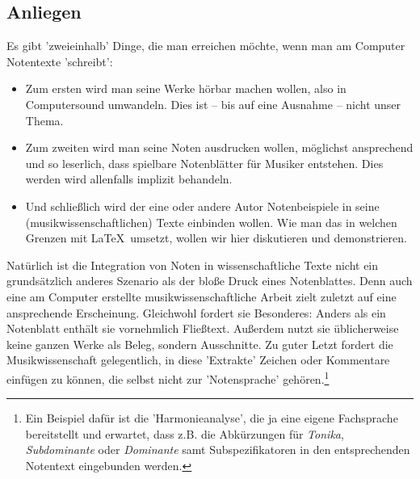 %
%
%



\subsection{Anliegen}

Es gibt 'zweieinhalb' Dinge, die man erreichen möchte, wenn man am Computer
Notentexte 'schreibt':

\begin{itemize}
  \item Zum ersten wird man seine Werke hörbar machen wollen, also in
  Computersound umwandeln. Dies ist -- bis auf eine Ausnahme -- nicht
  unser Thema.
  \item Zum zweiten wird man seine Noten ausdrucken wollen, möglichst
  ansprechend und so leserlich, dass spielbare Notenblätter für Musiker
  entstehen. Dies werden wird allenfalls implizit behandeln.
  \item Und schließlich wird der eine oder andere Autor Notenbeispiele in seine
  (musikwissenschaftlichen) Texte einbinden wollen. Wie man das in welchen
  Grenzen mit \LaTeX\ umsetzt, wollen wir hier diskutieren und demonstrieren.
\end{itemize}

Natürlich ist die Integration von Noten in wissenschaftliche Texte nicht ein
grundsätzlich anderes Szenario als der bloße Druck eines Notenblattes.
Denn auch eine am Computer erstellte musikwissenschaftliche Arbeit zielt zuletzt
auf eine ansprechende Erscheinung. Gleichwohl fordert sie Besonderes: Anders als
ein Notenblatt enthält sie vornehmlich Fließtext. Außerdem nutzt sie
üblicherweise keine ganzen Werke als Beleg, sondern Ausschnitte. Zu guter Letzt
fordert die Musikwissenschaft gelegentlich, in diese 'Extrakte' Zeichen oder
Kommentare einfügen zu können, die selbst nicht zur 'Notensprache'
gehören.\footnote{Ein Beispiel dafür ist die 'Harmonieanalyse', die ja eine
eigene Fachsprache bereitstellt und erwartet, dass z.B. die Abkürzungen für
\textit{Tonika}, \textit{Subdominante} oder \textit{Dominante} samt
Subspezifikatoren in den entsprechenden Notentext eingebunden werden.}

